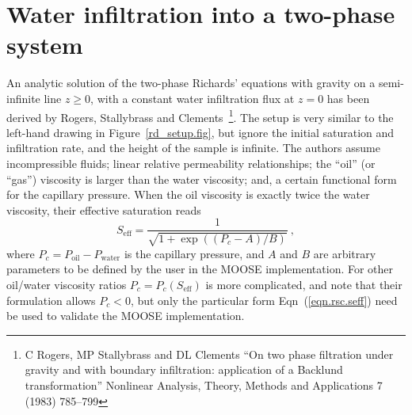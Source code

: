 \documentclass[]{scrreprt}
\begin{document}
\chapter{Water infiltration into a two-phase system}
\label{rsc}

An analytic solution of the two-phase Richards' equations with gravity
on a semi-infinite line $z\geq 0$, with a constant water infiltration
flux at $z=0$ has been derived by Rogers, Stallybrass and
Clements~\footnote{C Rogers, MP Stallybrass and DL Clements ``On two
  phase filtration under gravity and with boundary infiltration:
  application of a Backlund transformation'' Nonlinear Analysis,
  Theory, Methods and Applications 7 (1983) 785--799}.  The setup is
very similar to the left-hand drawing in Figure~\ref{rd_setup.fig},
but ignore the initial saturation and infiltration rate, and the
height of the sample is infinite.  The authors
assume incompressible fluids; linear relative permeability
relationships; the ``oil'' (or ``gas'') viscosity is larger than the
water viscosity; and, a certain functional form for the capillary
pressure.  When the oil viscosity is exactly twice the water
viscosity, their effective saturation reads
\begin{equation}
S_{\mathrm{eff}} = \frac{1}{\sqrt{1 + \exp((P_{c} - A)/B)}} \ ,
\label{eqn.rsc.seff}
\end{equation}
where $P_{c} = P_{\mathrm{oil}}-P_{\mathrm{water}}$ is the capillary
pressure, and $A$ and $B$ are arbitrary parameters to be defined by
the user in the MOOSE implementation.  For other oil/water viscosity
ratios $P_{c} = P_{c}(S_{\mathrm{eff}})$ is more complicated, and note
that their formulation allows $P_{c}<0$, but only
the particular form Eqn~(\ref{eqn.rsc.seff}) need be used to validate
the MOOSE implementation.
\end{document}
